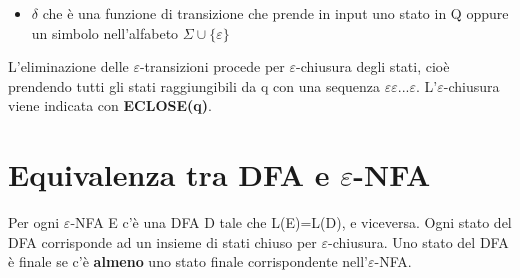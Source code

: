 \begin{itemize}
\item \textbf{$\delta$} che è una funzione di transizione che prende in input uno 
stato in Q oppure un simbolo nell'alfabeto $\Sigma \cup \{\varepsilon\}$
\end{itemize}

L'eliminazione delle $\varepsilon$-transizioni procede per $\varepsilon$-chiusura 
degli stati, cioè prendendo tutti gli stati raggiungibili da q con una sequenza $
\varepsilon\varepsilon... \varepsilon$. L'$\varepsilon$-chiusura viene indicata con 
\textbf{ECLOSE(q)}.

\section{Equivalenza tra DFA e $\varepsilon$\textrm{-NFA}}
Per ogni $\varepsilon$\textrm{-NFA} E c'è una DFA D tale che L(E)=L(D), e viceversa.
Ogni stato del DFA corrisponde ad un insieme di stati chiuso per 
$\varepsilon$\textrm{-chiusura}.
Uno stato del DFA è finale se c'è \textbf{almeno} uno stato finale corrispondente 
nell'$\varepsilon$\textrm{-NFA}.















